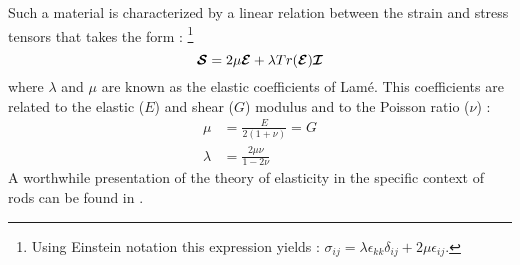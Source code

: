 Such a material is characterized by a linear relation between the strain and stress tensors that takes the form : \footnote{Using Einstein notation this expression yields : $\sigma_{ij} = \lambda \epsilon_{kk} \delta_{ij} + 2\mu\epsilon_{ij}$.}
\begin{equation}
	\boldsymbol{\mathcal{S}} = 2\mu\boldsymbol{\mathcal{E}} + \lambda Tr(\boldsymbol{\mathcal{E}}) \boldsymbol{\mathcal{I}}
\end{equation}
where $\lambda$ and $\mu$ are known as the elastic coefficients of Lamé. This coefficients are related to the elastic ($E$) and shear ($G$) modulus and to the Poisson ratio ($\nu$) :
\begin{subequations}
	\begin{alignat}{1}
	\mu &= \frac{E}{2(1+\nu)} = G
	\\[0.5em]
	\lambda &= \frac{2\mu\nu}{1-2\nu}
	\end{alignat}
\end{subequations}
A worthwhile presentation of the theory of elasticity in the specific context of rods can be found in \cite{Audoly2010}.

